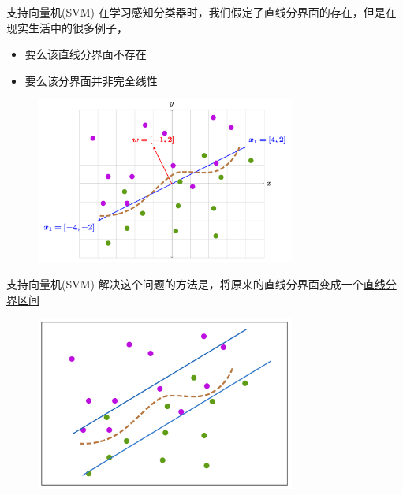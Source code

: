 \documentclass[handout]{ctexbeamer}
\begin{document}
\begin{frame}{支持向量机(SVM)}
在学习感知分类器时，我们假定了直线分界面的存在，但是在现实生活中的很多例子，
\begin{itemize}
	\item 要么该直线分界面不存在
	\item 要么该分界面并非完全线性
\end{itemize}
\begin{figure}[H]
	\centering
	\includegraphics[width=0.76\textwidth]{fig/C2C2svm1}
\end{figure}
\end{frame}

\begin{frame}{支持向量机(SVM)}
解决这个问题的方法是，将原来的直线分界面变成一个\underline{直线分界区间}
\begin{figure}[H]
	\centering
	\includegraphics[width=0.76\textwidth]{fig/C2C2svm2}
\end{figure}	
\end{frame}
\end{document}
